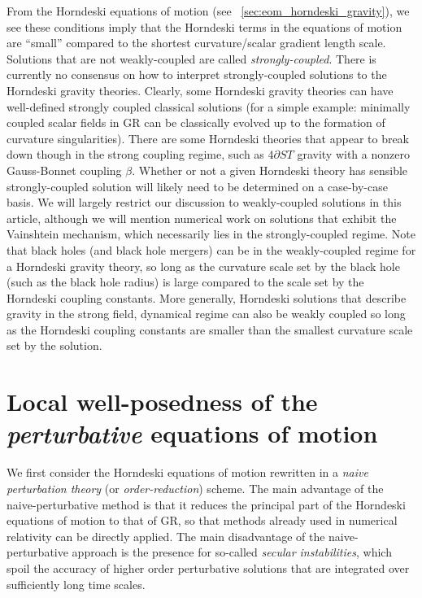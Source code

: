 \documentclass{ws-ijmpd}
\begin{document}
From the Horndeski equations of motion 
(see ~\ref{sec:eom_horndeski_gravity}), we see these conditions
imply that the Horndeski terms in the equations of motion
are ``small'' compared to the shortest curvature/scalar gradient length scale. 
Solutions that are not weakly-coupled are called \emph{strongly-coupled}.
There is currently
no consensus on how to interpret strongly-coupled solutions
to the Horndeski gravity theories. 
Clearly, some Horndeski gravity theories can have well-defined strongly coupled
classical solutions (for a simple example: minimally coupled scalar fields in GR
can be classically evolved up to the formation of 
curvature singularities\cite{Choptuik:1992jv}).
There are some Horndeski theories that appear to break down though in the
strong coupling regime, such as $4\partial ST$ gravity with a nonzero
Gauss-Bonnet coupling 
$\beta$\cite{Ripley:2019hxt,Ripley:2019irj,Ripley:2019aqj,Ripley:2020vpk,
East:2021bqk,Corelli:2022pio,Corelli:2022phw}.
Whether or not a given Horndeski theory has sensible strongly-coupled solution
will likely need to be determined on a case-by-case basis.
We will largely restrict our discussion to weakly-coupled solutions
in this article, although we will mention numerical work on solutions 
that exhibit the Vainshtein mechanism, which necessarily lies
in the strongly-coupled regime\cite{VAINSHTEIN1972393,Joyce:2014kja}.
Note that black holes (and black hole mergers) can be in the weakly-coupled
regime for a Horndeski gravity theory, so long as the curvature scale
set by the black hole (such as the black hole radius) is large compared
to the scale set by the Horndeski coupling constants.
More generally, Horndeski solutions that describe gravity in the 
strong field, dynamical regime can also be weakly coupled so long
as the Horndeski coupling constants are smaller than the smallest curvature
scale set by the solution.

\section{Local well-posedness of the \emph{perturbative} equations of motion
\label{sec:perturbative_well_posedness}
}
We first consider the Horndeski equations of motion rewritten in
a \emph{naive perturbation theory} (or \emph{order-reduction}) scheme.
The main advantage of the naive-perturbative method is that it reduces
the principal part of the Horndeski equations of motion to that
of GR, so that methods already used in numerical relativity can be
directly applied.
The main disadvantage of the naive-perturbative approach is the presence 
for so-called \emph{secular instabilities}, which 
spoil the accuracy of higher order perturbative solutions that are integrated
over sufficiently long time scales.
\end{document}
